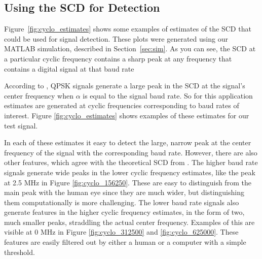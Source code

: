 \documentclass[12pt]{article}
\begin{document}
\subsection{Using the SCD for Detection}
Figure~\ref{fig:cyclo_estimates} shows some examples of estimates of the SCD
that could be used for signal detection. These plots were generated using our
MATLAB simulation, described in Section~\ref{sec:sim}. As you can see, the SCD
at a particular cyclic frequency contains a sharp peak at any frequency that
contains a digital signal at that baud rate

According to \cite{Gardner2}, QPSK signals generate a large peak in the SCD at
the signal's center frequency when $\alpha$ is equal to the signal baud rate.
So for this application estimates are generated at cyclic frequencies
corresponding to baud rates of interest. Figure \ref{fig:cyclo_estimates} shows
examples of these estimates for our test signal.

In each of these estimates it easy to detect the large, narrow peak at the
center frequency of the signal with the corresponding baud rate. However, there
are also other features, which agree with the theoretical SCD from
\cite{Gardner2}.  The higher baud rate signals generate wide peaks in the lower
cyclic frequency estimates, like the peak at 2.5 MHz in Figure
\ref{fig:cyclo_156250}. These are easy to distinguish from the main peak with
the human eye since they are much wider, but distinguishing them computationally
is more challenging. The lower baud rate signals also generate features in the
higher cyclic frequency estimates, in the form of two, much smaller peaks,
straddling the actual center frequency. Examples of this are visible at 0 MHz
in Figure \ref{fig:cyclo_312500} and \ref{fig:cyclo_625000}. These features are
easily filtered out by either a human or a computer with a simple threshold.
\end{document}
